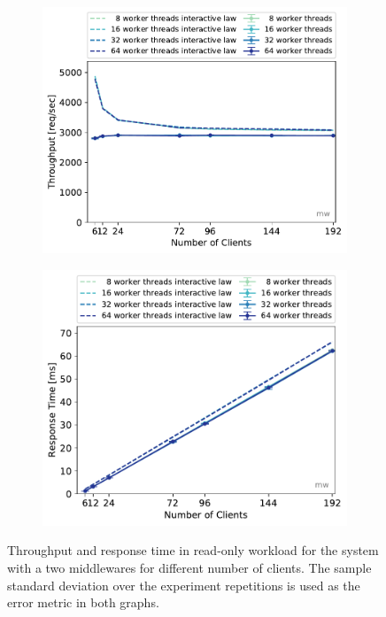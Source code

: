 \documentclass[11pt,a4paper]{article}
\begin{document}
\begin{figure}
	\begin{subfigure}[b]{.49\linewidth}
		\centering
		\includegraphics[width=\linewidth]{data/exp32_ro_tp_nc_w.pdf}
	\end{subfigure}\hfill
	\begin{subfigure}[b]{.49\linewidth}
		\centering
		\includegraphics[width=\linewidth]{data/exp32_ro_rt_nc_w.pdf}
	\end{subfigure}%
	\caption{Throughput and response time in read-only workload for the system with a two middlewares for different number of clients. The sample standard deviation over the experiment repetitions is used as the error metric in both graphs.}\label{exp32_ro_tp_nc}
\end{figure}
\end{document}
